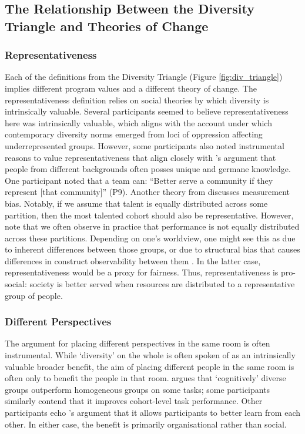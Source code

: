 \subsection{The Relationship Between the Diversity Triangle and Theories of Change}
\subsubsection{Representativeness}
Each of the definitions from the Diversity Triangle (Figure \ref{fig:div_triangle}) implies different program values and a different theory of change. The representativeness
definition relies on social theories by which diversity is intrinsically valuable. Several participants seemed to believe representativeness here was intrinsically valuable, which aligns with the \textcite{morris1984origins} account under which contemporary diversity norms emerged from loci of oppression affecting underrepresented groups. However, some participants also noted instrumental reasons to value representativeness that align closely with \textcite{peters2021hidden,page_difference_2007}'s argument that people from different backgrounds often posses unique and germane knowledge. One participant noted that a team can: ``Better serve a community if they represent [that community]'' (P9). Another theory from \textcite{friedler_impossibility_2016} discusses measurement bias. Notably, if we assume that talent is equally distributed across some partition, then the most talented cohort should also be representative. However, \textcite{friedler_impossibility_2016} note that we often observe in practice that performance is not equally distributed across these partitions. Depending on one's worldview, one might see this as due to inherent differences between those groups, or due to structural bias that causes differences in construct observability between them \cite{friedler_impossibility_2016}. In the latter case, representativeness would be a proxy for fairness. Thus, representativeness is pro-social: society is better served when resources are distributed to a representative group of people.

\subsubsection{Different Perspectives}
The argument for placing different perspectives in the same room is often instrumental. While `diversity' on the whole is often spoken of as an intrinsically valuable broader benefit, the aim of placing different people in the same room is often only to benefit the people in that room. \textcite{page_diversity_2010} argues that `cognitively' diverse groups outperform homogeneous groups on some tasks; some participants similarly contend that it improves cohort-level task performance. Other participants echo \textcite{wylie2006introduction}'s argument that it allows participants to better learn from each other. In either case, the benefit is primarily organisational rather than social.


